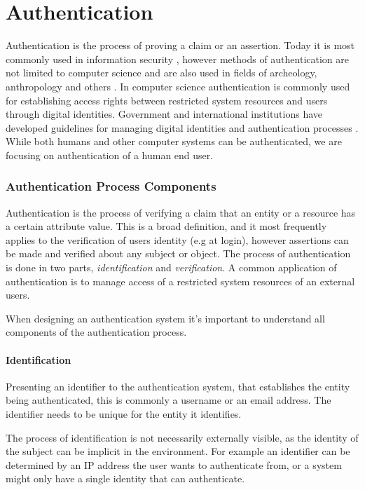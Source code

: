 \section{Authentication}

Authentication is the process of proving a claim or an assertion.
Today it is most commonly used in information security \cite{shirey2007internet}, however methods of authentication are not limited to computer science and are also used in fields of archeology, anthropology and others \cite{Odegaard2014}.
\bigskip
\newline
In computer science authentication is commonly used for establishing access rights between restricted system resources and users through digital identities.
Government and international institutions have developed guidelines for managing digital identities and authentication processes \cite{grassi2017} .
\bigskip
\newline
While both humans and other computer systems can be authenticated, we are focusing on authentication of a human end user.

\subsubsection{Authentication Process Components}
Authentication \cite{shirey2007internet} is the process of verifying a claim that an entity or a resource has a certain attribute value.
This is a broad definition, and it most frequently applies to the verification of users identity (e.g at login), however assertions can be made and verified about any subject or object.
The process of authentication is done in two parts, \textit{identification} and \textit{verification}.
A common application of authentication is to manage access of a restricted system resources of an external users.

When designing an authentication system it's important to understand all components of the authentication process.

\paragraph{Identification} Presenting an identifier to the authentication system, that establishes the entity being authenticated, this is commonly a username or an email address.
The identifier needs to be unique for the entity it identifies.

The process of identification is not necessarily externally visible, as the identity of the subject can be implicit in the environment. 
For example an identifier can be determined by an IP address the user wants to authenticate from, or a system might only have a single identity that can authenticate.


